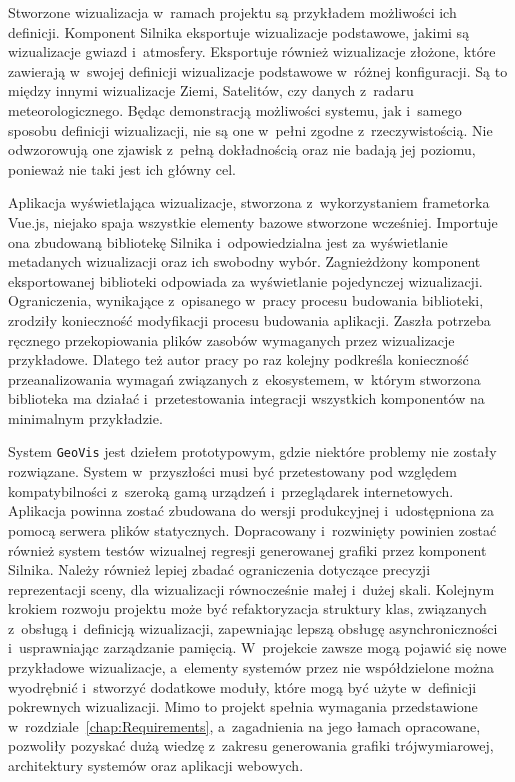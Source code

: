 Stworzone wizualizacja w~ramach projektu są przykładem możliwości ich definicji. Komponent Silnika eksportuje wizualizacje podstawowe, jakimi są wizualizacje gwiazd i~atmosfery. Eksportuje również wizualizacje złożone, które zawierają w~swojej definicji wizualizacje podstawowe w~różnej konfiguracji. Są to między innymi wizualizacje Ziemi, Satelitów, czy danych z~radaru meteorologicznego. Będąc demonstracją możliwości systemu, jak i~samego sposobu definicji wizualizacji, nie są one w~pełni zgodne z~rzeczywistością. Nie odwzorowują one zjawisk z~pełną dokładnością oraz nie badają jej poziomu, ponieważ nie taki jest ich główny cel.

Aplikacja wyświetlająca wizualizacje, stworzona z~wykorzystaniem frametorka Vue.js, niejako spaja wszystkie elementy bazowe stworzone wcześniej. Importuje ona zbudowaną bibliotekę Silnika i~odpowiedzialna jest za wyświetlanie metadanych wizualizacji oraz ich swobodny wybór. Zagnieżdżony komponent eksportowanej biblioteki odpowiada za wyświetlanie pojedynczej wizualizacji. Ograniczenia, wynikające z~opisanego w~pracy procesu budowania biblioteki, zrodziły konieczność modyfikacji procesu budowania aplikacji. Zaszła potrzeba ręcznego przekopiowania plików zasobów wymaganych przez wizualizacje przykładowe. Dlatego też autor pracy po raz kolejny podkreśla konieczność przeanalizowania wymagań związanych z~ekosystemem, w~którym stworzona biblioteka ma działać i~przetestowania integracji wszystkich komponentów na minimalnym przykładzie.

System \texttt{GeoVis} jest dziełem prototypowym, gdzie niektóre problemy nie zostały rozwiązane. System w~przyszłości musi być przetestowany pod względem kompatybilności z~szeroką gamą urządzeń i~przeglądarek internetowych. Aplikacja powinna zostać zbudowana do wersji produkcyjnej i~udostępniona za pomocą serwera plików statycznych. Dopracowany i~rozwinięty powinien zostać również system testów wizualnej regresji generowanej grafiki przez komponent Silnika. Należy również lepiej zbadać ograniczenia dotyczące precyzji reprezentacji sceny, dla wizualizacji równocześnie małej i~dużej skali. Kolejnym krokiem rozwoju projektu może być refaktoryzacja struktury klas, związanych z~obsługą i~definicją wizualizacji, zapewniając lepszą obsługę asynchroniczności i~usprawniając zarządzanie pamięcią. W~projekcie zawsze mogą pojawić się nowe przykładowe wizualizacje, a~elementy systemów przez nie współdzielone można wyodrębnić i~stworzyć dodatkowe moduły, które mogą być użyte w~definicji pokrewnych wizualizacji. Mimo to projekt spełnia wymagania przedstawione w~rozdziale~\ref{chap:Requirements}, a~zagadnienia na jego łamach opracowane, pozwoliły pozyskać dużą wiedzę z~zakresu generowania grafiki trójwymiarowej, architektury systemów oraz aplikacji webowych.

